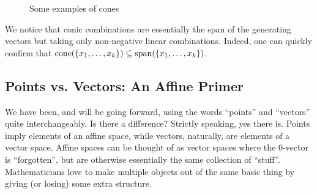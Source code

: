 \documentclass[12pt,oneside]{../../sfsuthesis}
\begin{document}
\begin{figure}[H]
\begin{subfigure}[t]{0.3\textwidth}

    \end{subfigure}
    \caption{Some examples of cones}
    \label{fig:cones}
\end{figure}
We notice that conic combinations are essentially the span of the generating vectors but taking only non-negative linear combinations.
Indeed, one can quickly confirm that \( \mathrm{cone}(\{x_1, \dots, x_k\}) \subseteq \operatorname{span}(\{x_1, \dots, x_k\}) \).

\subsection{Points vs. Vectors: An Affine Primer}
We have been, and will be going forward, using the words ``points'' and ``vectors'' quite interchangeably.
Is there a difference?
Strictly speaking, yes there is.
Points imply elements of an affine space, while vectors, naturally, are elements of a vector space.
Affine spaces can be thought of as vector spaces where the \( 0 \)-vector is ``forgotten'', but are otherwise essentially the same collection of ``stuff''.
Mathematicians love to make multiple objects out of the same basic thing by giving (or losing) some extra structure.
\end{document}
